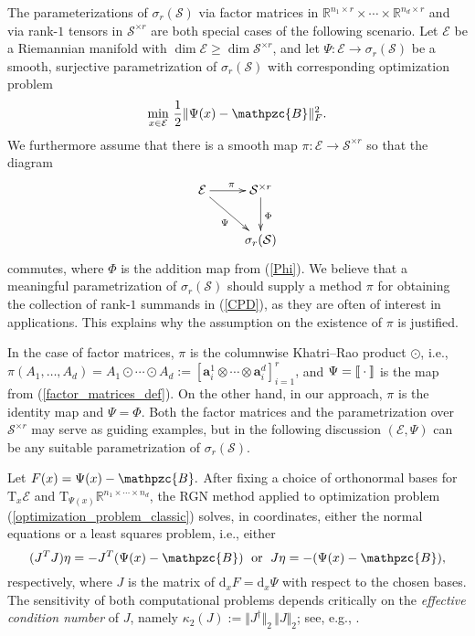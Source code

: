 \documentclass[a4paper,10pt,final]{siamart1116}
\newcommand{\Var}[1]{\mathcal{#1}}
\newcommand{\tensor}[1]{\mathpzc{#1}}
\newcommand{\vect}[1]{\mathbf{#1}}
\newcommand{\sten}[3]{\vect{#1}_{#2}^{#3}}
\newcommand{\Tang}[2]{\mathrm{T}_{#1} {#2}}
\newcommand{\deriv}[2]{\mathrm{d}_{#1}#2}
\newcommand{\R}{\mathbb{R}}
\newcommand{\refeqn}[1]{{(\ref{#1})}}
\numberwithin{equation}{section}
\numberwithin{figure}{section}
\numberwithin{table}{section}
\numberwithin{theorem}{section}
\begin{document}
The parameterizations of $\sigma_r(\Var{S})$ via factor matrices in $\R^{n_1 \times r} \times \cdots \times \R^{n_d \times r}$ and via rank-$1$ tensors in $\Var{S}^{\times r}$ are both special cases of the following scenario. Let $\Var E$ be a Riemannian manifold with $\dim \Var{E} \geq \dim \Var{S}^{\times r}$, and let
\(
\Psi: \Var E \rightarrow \sigma_r(\Var{S})
\)
be a smooth, surjective parametrization of $\sigma_r(\Var{S})$ with corresponding optimization problem
\begin{equation}\label{optimization_problem_classic}
  \min_{x \in \Var{E}}\,\frac{1}{2} \|\Psi(x) - \tensor{B} \|_F^2.
\end{equation}
We furthermore assume that there is a smooth map $\pi:\Var{E} \to \Var{S}^{\times r}$ so that the diagram
$$
\xymatrix{
\Var E  \ar[dr]_\Psi \ar[r]^\pi&\Var{S}^{\times r}\ar[d]^\Phi\\
 &\sigma_r(\Var{S})}
$$
commutes, where $\Phi$ is the addition map from \refeqn{Phi}. We believe that a meaningful parametrization of $\sigma_r(\Var{S})$ should supply a method $\pi$ for obtaining the collection of rank-$1$ summands in \refeqn{CPD}, as they are often of interest in applications. This explains why the assumption on the existence of $\pi$ is justified.

In the case of factor matrices, $\pi$ is {the columnwise Khatri--Rao product $\odot$, i.e., $\pi(A_1,\ldots,A_d) = A_1 \odot \cdots \odot A_d := [\sten{a}{i}{1}\otimes \cdots \otimes \sten{a}{i}{d}]_{i=1}^r$,} and $\Psi={\text\textlbrackdbl}\cdot {\text\textrbrackdbl}$ is the map from \refeqn{factor_matrices_def}. On the other hand, in our approach, $\pi$ is the identity map and $\Psi=\Phi$. Both the factor matrices and the parametrization over $\Var{S}^{\times r}$ may serve as guiding examples, but in the following discussion $(\Var E,\Psi)$ can be any suitable parametrization of $\sigma_r(\Var S)$.

Let $F(x)=\Psi(x) - \tensor{B}.$
After fixing a choice of orthonormal bases for $\Tang{x}{\Var{E}}$ and $\Tang{\Psi(x)}{\R^{n_1 \times \cdots \times n_d}}$, the RGN method applied to optimization problem \refeqn{optimization_problem_classic} solves, in coordinates, either the normal equations or a least squares problem, i.e., either
\begin{equation*} %
 (J^TJ) \eta = -J^T (\Psi(x) - \tensor{B})
 \;\text{ or }\;
 J \eta = - (\Psi(x) - \tensor{B}),
\end{equation*}
respectively, where {$J$ is the matrix of} $\deriv{x}{F}=\deriv{x}{\Psi}$ with respect to the chosen bases. The sensitivity of both computational problems depends {critically} on the \emph{effective condition number} of $J$, namely $\kappa_2(J) := \Vert J^\dagger \Vert_2\,\Vert J\Vert_2$; see, e.g., \cite[section 5.3.8]{matrix_computations}.
\end{document}
